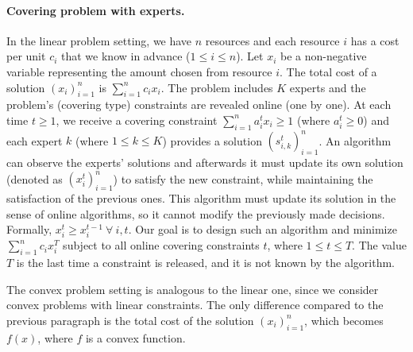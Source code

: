 \paragraph{Covering problem with experts.}
In the linear problem setting, we have $n$ resources and each resource $i$ has a cost per unit $c_{i}$ that we know in advance ($1 \leq i \leq n$).
Let $x_{i}$ be a non-negative variable representing the amount chosen from resource $i$.
The total cost of a solution $(x_{i})_{i=1}^{n}$ is $\sum_{i=1}^{n} c_{i} x_{i}$.
The problem includes $K$ experts and the problem's (covering type) constraints are revealed online (one by one).
At each time $t \geq 1$, we receive a covering constraint $\sum_{i=1}^{n} a_{i}^{t} x_{i} \geq 1$ (where $a_{i}^{t} \geq 0$) and each expert $k$ (where $1 \leq k \leq K$) provides
a solution $(s_{i,k}^{t})_{i=1}^{n}$. An algorithm can observe the experts' solutions and afterwards it must update its own solution (denoted as $(x_{i}^{t})_{i=1}^{n}$)
to satisfy the new constraint, while maintaining the satisfaction of the previous ones. This algorithm must update its solution in the sense of online algorithms, so it cannot modify the previously made decisions. Formally, $x_{i}^{t} \geq x_{i}^{t-1} ~\forall\ i, t$.
Our goal is to design such an algorithm and minimize $\sum_{i=1}^{n} c_{i} x_{i}^{T}$ subject to
all online covering constraints $t$, where $1 \leq t \leq T$. The value $T$ is the last time a constraint is released, and it is not known by the algorithm.

The convex problem setting is analogous to the linear one, since we consider convex problems with linear constraints. The only difference compared to the previous paragraph is the total cost of the solution $(x_{i})_{i=1}^{n}$, which becomes $f(x)$, where $f$ is a convex function.

